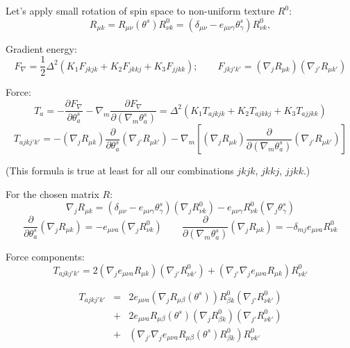 \documentclass[a4paper]{article}
\begin{document}
Let's apply small rotation of spin space to non-uniform texture $R^0$:
$$
R_{\mu k} = R_{\mu\nu}(\theta^s) R^0_{\nu k} =
(\delta_{\mu\nu} - e_{\mu\nu\gamma}\theta^s_\gamma) R^0_{\nu k},
$$

Gradient energy:
$$
F_\nabla = \frac12 \Delta^2 ( K_1 F_{jkjk} + K_2 F_{jkkj} + K_3 F_{jjkk});
\qquad
F_{jkj'k'} = (\nabla_j R_{\mu k})(\nabla_{j'} R_{\mu k'})
$$

Force:
$$
T_a = - \frac{\partial F_\nabla}{\partial\theta^s_a}
- \nabla_m \frac{\partial F_\nabla}{\partial(\nabla_m\theta^s_a)} =
\Delta^2 ( K_1 T_{ajkjk} + K_2 T_{ajkkj} + K_3 T_{ajjkk})
$$
$$
T_{ajkj'k'} =
- (\nabla_j R_{\mu k})
  \frac{\partial}{\partial\theta^s_a} (\nabla_{j'} R_{\mu k'})
- \nabla_m \left[
  (\nabla_j R_{\mu k})
  \frac{\partial}{\partial(\nabla_m\theta^s_a)} (\nabla_{j'} R_{\mu k'})\right]
$$

(This formula is true at least for all our combinations $jkjk$, $jkkj$, $jjkk$.)

For the chosen matrix $R$:
$$
\nabla_j R_{\mu k} =
(\delta_{\mu\nu} - e_{\mu\nu\gamma}\theta^s_\gamma)(\nabla_j R^0_{\nu k})
- e_{\mu\nu \gamma} R^0_{\nu k} (\nabla_j \theta^s_\gamma)
$$
$$
\frac{\partial}{\partial\theta^s_a} (\nabla_j R_{\mu k}) =
- e_{\mu\nu a} (\nabla_j R^0_{\nu k})
\qquad
\frac{\partial}{\partial(\nabla_m\theta^s_a)} (\nabla_j R_{\mu k}) =
- \delta_{mj} e_{\mu\nu a} R^0_{\nu k}
$$

Force components:
$$
T_{ajkj'k'} =
2 (\nabla_j e_{\mu\nu a} R_{\mu k}) (\nabla_{j'} R^0_{\nu k'})
+  ( \nabla_{j'} \nabla_j e_{\mu\nu a} R_{\mu k}) R^0_{\nu k'}
$$


\begin{eqnarray*}
T_{ajkj'k'}
&=& 2 e_{\mu\nu a} (\nabla_j R_{\mu\beta}(\theta^s)) R^0_{\beta k} (\nabla_{j'} R^0_{\nu k'})\\
&+& 2 e_{\mu\nu a} R_{\mu\beta}(\theta^s) (\nabla_j R^0_{\beta k}) (\nabla_{j'} R^0_{\nu k'})\\
&+&  ( \nabla_{j'} \nabla_j e_{\mu\nu a} R_{\mu\beta}(\theta^s) R^0_{\beta k}) R^0_{\nu k'}\\
\end{eqnarray*}
\end{document}
